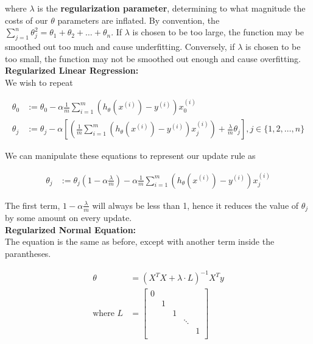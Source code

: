 \noindent where $\lambda$ is the \textbf{regularization parameter}, determining to what magnitude the
costs of our $\theta$ parameters are inflated. By convention, the $\sum^n_{j=1}\theta^2_j=\theta_1+
\theta_2+\dots+\theta_n$. If $\lambda$ is chosen to be too large, the function may be smoothed out too
much and cause underfitting. Conversely, if $\lambda$ is chosen to be too small, the function may not
be smoothed out enough and cause overfitting. \\

\noindent \textbf{Regularized Linear Regression:} \\
We wish to repeat

\begin{align*}
    \theta_0    &:= \theta_0-\alpha\frac{1}{m}\sum^m_{i=1} (h_\theta(x^{(i)})-y^{(i)})x_0^{(i)} \\
    \theta_j    &:= \theta_j-\alpha\left[\left(\frac{1}{m}\sum^m_{i=1}(h_\theta(x^{(i)})-y^{(i)})x_j^{(i)}
    \right)+\frac{\lambda}{m}\theta_j\right], j\in\{1,2,\dots,n\}
\end{align*}

\noindent We can manipulate these equations to represent our update rule as

\begin{align*}
    \theta_j    &:= \theta_j\left(1-\alpha\frac{\lambda}{m}\right)-\alpha\frac{1}{m}\sum^m_{i=1}
    (h_\theta(x^{(i)})-y^{(i)})x_j^{(i)}
\end{align*}

\noindent The first term, $1-\alpha\frac{\lambda}{m}$ will always be less than 1, hence it reduces the
value of $\theta_j$ by some amount on every update. \\

\noindent \textbf{Regularized Normal Equation:} \\
The equation is the same as before, except with another term inside the parantheses.

\begin{align*}
    \theta          &= \left(X^T X+\lambda\cdot L\right)^{-1} X^T y \\
    \text{where } L &= \begin{bmatrix} 0 & & & & \\ & 1 & & & \\ & & 1 & & \\ & & & \ddots & \\
    & & & & 1 \\ \end{bmatrix}
\end{align*}

